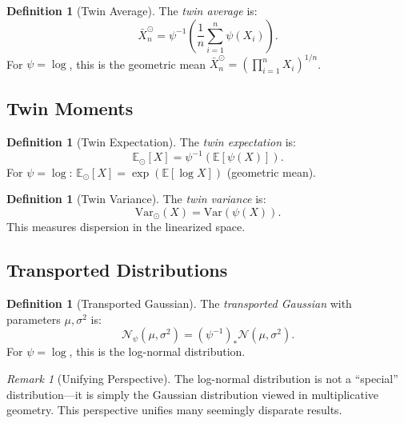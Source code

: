 \documentclass[11pt,twoside,openright]{book}
\theoremstyle{plain}
\theoremstyle{definition}
\newtheorem{definition}[theorem]{Definition}
\theoremstyle{remark}
\newtheorem{remark}[theorem]{Remark}
\newcommand{\calN}{\mathcal{N}}
\newcommand{\E}{\mathbb{E}}
\newcommand{\var}{\mathrm{Var}}
\newcommand{\twin}{\odot}
\newcommand{\Etwin}{\mathbb{E}_{\twin}}
\newcommand{\Vartwin}{\mathrm{Var}_{\twin}}
\begin{document}
\begin{definition}[Twin Average]
The \emph{twin average} is:
\begin{equation}
\bar{X}_n^{\twin} = \psi^{-1}\left(\frac{1}{n} \sum_{i=1}^n \psi(X_i)\right).
\label{eq:twin-average}
\end{equation}
For $\psi = \log$, this is the geometric mean $\bar{X}_n^{\twin} = (\prod_{i=1}^n X_i)^{1/n}$.
\end{definition}

\subsection{Twin Moments}

\begin{definition}[Twin Expectation]
The \emph{twin expectation} is:
\begin{equation}
\Etwin[X] = \psi^{-1}(\E[\psi(X)]).
\label{eq:twin-expectation}
\end{equation}
For $\psi = \log$: $\Etwin[X] = \exp(\E[\log X])$ (geometric mean).
\end{definition}

\begin{definition}[Twin Variance]
The \emph{twin variance} is:
\begin{equation}
\Vartwin(X) = \var(\psi(X)).
\label{eq:twin-variance}
\end{equation}
This measures dispersion in the linearized space.
\end{definition}

\subsection{Transported Distributions}

\begin{definition}[Transported Gaussian]
The \emph{transported Gaussian} with parameters $\mu, \sigma^2$ is:
\begin{equation}
\calN_\psi(\mu, \sigma^2) = (\psi^{-1})_* \calN(\mu, \sigma^2).
\label{eq:transported-gaussian}
\end{equation}
For $\psi = \log$, this is the log-normal distribution.
\end{definition}

\begin{remark}[Unifying Perspective]
The log-normal distribution is not a ``special'' distribution---it is simply the Gaussian distribution viewed in multiplicative geometry. This perspective unifies many seemingly disparate results.
\end{remark}
\end{document}
